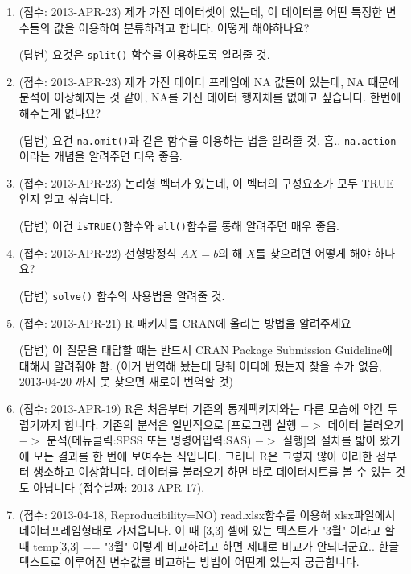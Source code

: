 \documentclass{report}
\begin{document}
\begin{enumerate}
	


	\item (접수: 2013-APR-23)  제가 가진 데이터셋이 있는데, 이 데이터를 어떤 특정한 변수들의 값을 이용하여 분류하려고 합니다.  어떻게 해야하나요?
	
	\textsf{(답변)}  요것은 \texttt{split()} 함수를 이용하도록 알려줄 것. 

	\item (접수: 2013-APR-23) 제가 가진 데이터 프레임에 NA 값들이 있는데, NA 때문에 분석이 이상해지는 것 같아, NA를 가진 데이터 행자체를 없애고 싶습니다.  한번에 해주는게 없나요? 
	
	\textsf{(답변)}  요건 \texttt{na.omit()}과 같은 함수를 이용하는 법을 알려줄 것.  흠.. \texttt{na.action}이라는 개념을 알려주면 더욱 좋음. 

	\item (접수: 2013-APR-23) 논리형 벡터가 있는데, 이 벡터의 구성요소가 모두 TRUE 인지 알고 싶습니다. 
	
	\textsf{(답변)} 이건 \texttt{isTRUE()}함수와 \texttt{all()}함수를 통해 알려주면 매우 좋음.
		
	\item (접수: 2013-APR-22) 선형방정식 $AX=b$의 해 $X$를 찾으려면 어떻게 해야 하나요? 
	
	\textsf{(답변)} \texttt{solve()} 함수의 사용법을 알려줄 것.
	
	\item (접수: 2013-APR-21) R 패키지를 CRAN에 올리는 방법을 알려주세요 
	
	\textsf{(답변)} 이 질문을 대답할 때는 반드시 CRAN Package Submission Guideline에 대해서 알려줘야 함.  (이거 번역해 놨는데 당췌 어디에 뒀는지 찾을 수가 없음, 2013-04-20 까지 못 찾으면 새로이 번역할 것)
	
	\item (접수: 2013-APR-19) R은 처음부터 기존의 통계팩키지와는 다른 모습에 약간 두렵기까지 합니다.  기존의 분석은 일반적으로 $[$프로그램 실행 $->$ 데이터 불러오기 $->$ 분석(메뉴클릭:SPSS 또는 명령어입력:SAS) $->$ 실행$]$의 절차를 밟아 왔기에 모든 결과를 한 번에 보여주는 식입니다. 그러나 R은 그렇지 않아 이러한 점부터 생소하고 이상합니다.  데이터를 불러오기 하면 바로 데이터시트를 볼 수 있는 것도 아닙니다 (접수날짜: 2013-APR-17).

	\item (접수: 2013-04-18, Reproducibility=NO) read.xlsx함수를 이용해 xlsx파일에서 데이터프레임형태로 가져옵니다. 이 때 [3,3] 셀에 있는 텍스트가 "3월" 이라고 할 때 temp[3,3] == "3월" 이렇게 비교하려고 하면 제대로 비교가 안되더군요.. 한글 텍스트로 이루어진 변수값를 비교하는 방법이 어떤게 있는지 궁금합니다.
	

\end{enumerate}
\end{document}

